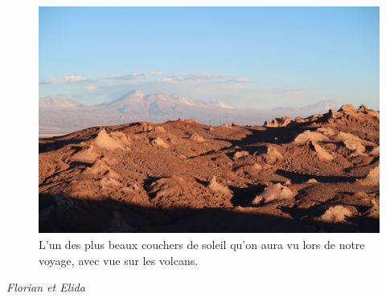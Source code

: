 \begin{figure}
\centering
\includegraphics{images/20180904_sanpedrocoucher.JPG}
\caption{L'un des plus beaux couchers de soleil qu'on aura vu lors de
notre voyage, avec vue sur les volcans.}
\end{figure}

\emph{Florian et Elida}


